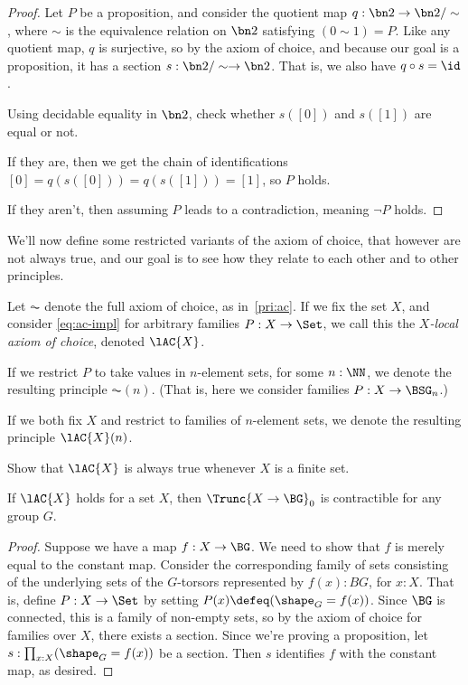 \begin{proof}
  Let $P$ be a proposition, and consider the quotient map $q : \bn 2 \to \bn 2/\sim$,
  where $\sim$ is the equivalence relation on $\bn 2$ satisfying $(0 \sim 1) = P$.
  Like any quotient map, $q$ is surjective, so by the axiom of choice,
  and because our goal is a proposition,
  it has a section $s : \bn 2/\sim \to \bn 2$.
  That is, we also have $q\circ s = \id$.

  Using decidable equality in $\bn 2$, check whether $s([0])$ and $s([1])$ are equal
  or not.

  If they are, then we get the chain of identifications
  $[0] = q(s([0])) = q(s([1])) = [1]$, so $P$ holds.

  If they aren't, then assuming $P$ leads to a contradiction, meaning $\lnot P$ holds.
\end{proof}

We'll now define some restricted variants of the axiom of choice,
that however are not always true,
and our goal is to see how they relate to each other and to other principles.

\begin{definition}
  Let $\AC$ denote the full axiom of choice, as in~\cref{pri:ac}.
  If we fix the set $X$, and consider \eqref{eq:ac-impl} for arbitrary families $P:X\to\Set$, we call this the \emph{$X$-local axiom of choice}, denoted $\lAC{X}$.

  If we restrict $P$ to take values in $n$-element sets, for some $n:\NN$,
  we denote the resulting principle $\AC(n)$.
  (That is, here we consider families $P : X \to \BSG_n$.)

  If we both fix $X$ and restrict to families of $n$-element sets,
  we denote the resulting principle $\lAC{X}(n)$.
\end{definition}

\begin{xca}
  Show that $\lAC{X}$ is always true whenever $X$ is a finite set.
\end{xca}

\begin{lemma}\label{lem:ac-impl-triv-coh-sets}
  If $\lAC{X}$ holds for a set $X$,
  then $\Trunc{X \to \BG}_0$ is contractible for any group $G$.
\end{lemma}

\begin{proof}
  Suppose we have a map $f : X \to \BG$.
  We need to show that $f$ is merely equal to the constant map.
  Consider the corresponding family of sets
  consisting of the underlying sets of the $G$-torsors represented by
  $f(x) : BG$, for $x:X$.
  That is, define $P : X \to \Set$ by setting $P(x) \defeq (\shape_G = f(x))$.
  Since $\BG$ is connected, this is a family of non-empty sets,
  so by the axiom of choice for families over $X$,
  there exists a section.
  Since we're proving a proposition, let $s : \prod_{x:X}(\shape_G = f(x))$
  be a section.
  Then $s$ identifies $f$ with the constant map, as desired.
\end{proof}

